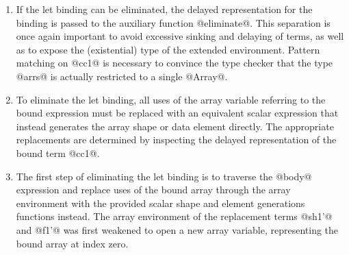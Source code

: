 \begin{enumerate}
    If the let binding will not be eliminated, it is added to the extended
    environment, indicating that it is to be evaluated to a manifest term. Note
    that it is important to add the term to a \emph{new} environment. Otherwise,
    nested let bindings are effectively flattened, resulting in terms required
    for the bound term being lifted out into the same scope as the body. That
    is, if we don't place the binding into a fresh environment, we get terms
    such as:
\begin{lstlisting}[style=haskell]
let a0  = %$\langle$ terms for binding $\rangle$% in
let bnd = %$\langle$ bound term $\rangle$% in
%$\langle$ body term $\rangle$%
\end{lstlisting}
    Rather than the following, where the scope of @a0@ is restricted to the
    evaluation of the bound term only:
\begin{lstlisting}[style=haskell]
let bnd =
  let a0 = %$\langle$ terms for binding $\rangle$%
  in %$\langle$ bound term $\rangle$%
in %$\langle$ body term $\rangle$%
\end{lstlisting}
    Removing the nested structure of let bindings increases the scope of bound
    terms, and hence has the side effect of increasing the maximum memory usage.

\item If the let binding can be eliminated, the delayed representation for the
    binding is passed to the auxiliary function @eliminate@. This separation is
    once again important to avoid excessive sinking and delaying of terms, as
    well as to expose the (existential) type of the extended environment.
    Pattern matching on @cc1@ is necessary to convince the type checker that the
    type @arrs@ is actually restricted to a single @Array@.

\item To eliminate the let binding, all uses of the array variable referring to
    the bound expression must be replaced with an equivalent scalar expression
    that instead generates the array shape or data element directly. The
    appropriate replacements are determined by inspecting the delayed
    representation of the bound term @cc1@.

\item The first step of eliminating the let binding is to traverse the @body@
    expression and replace uses of the bound array through the array environment
    with the provided scalar shape and element generations functions instead.
    The array environment of the replacement terms @sh1'@ and @f1'@ was first
    weakened to open a new array variable, representing the bound array at index
    zero.


\end{enumerate}
